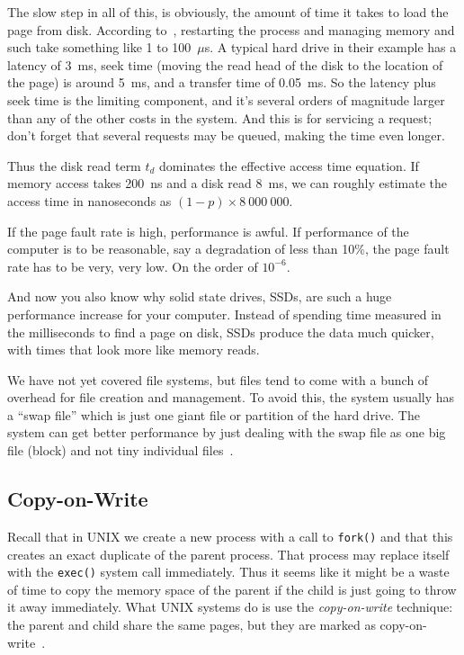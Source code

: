 The slow step in all of this, is obviously, the amount of time it takes to load the page from disk. According to~\cite{osc}, restarting the process and managing memory and such take something like 1 to 100~$\mu$s. A typical hard drive in their example has a latency of 3~ms, seek time (moving the read head of the disk to the location of the page) is around 5~ms, and a transfer time of 0.05~ms. So the latency plus seek time is the limiting component, and it's several orders of magnitude larger than any of the other costs in the system. And this is for servicing a request; don't forget that several requests may be queued, making the time even longer.

Thus the disk read term $t_{d}$ dominates the effective access time equation. If memory access takes 200~ns and a disk read 8~ms, we can roughly estimate the access time in nanoseconds as $(1-p) \times 8~000~000$. 

If the page fault rate is high, performance is awful. If performance of the computer is to be reasonable, say a degradation of less than 10\%, the page fault rate has to be very, very low. On the order of $10^{-6}$. 

And now you also know why solid state drives, SSDs, are such a huge performance increase for your computer. Instead of spending time measured in the milliseconds to find a page on disk, SSDs produce the data much quicker, with times that look more like memory reads.

We have not yet covered file systems, but files tend to come with a bunch of overhead for file creation and management. To avoid this, the system usually has a ``swap file'' which is just one giant file or partition of the hard drive. The system can get better performance by just dealing with the swap file as one big file (block) and not tiny individual files~\cite{osc}.

\subsection*{Copy-on-Write}
Recall that in UNIX we create a new process with a call to \texttt{fork()} and that this creates an exact duplicate of the parent process. That process may replace itself with the \texttt{exec()} system call immediately. Thus it seems like it might be a waste of time to copy the memory space of the parent if the child is just going to throw it away immediately. What UNIX systems do is use the \textit{copy-on-write} technique: the parent and child share the same pages, but they are marked as copy-on-write~\cite{osc}.

